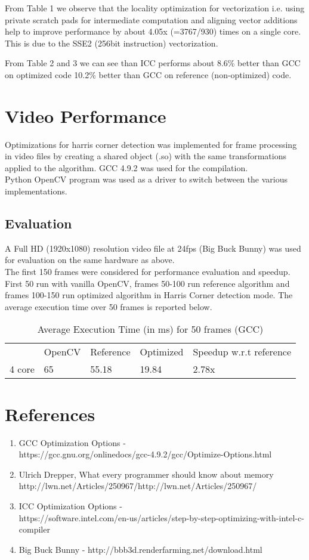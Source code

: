\documentclass[]{article}
\begin{document}
From Table 1 we observe that the locality optimization for vectorization i.e. using private scratch pads for intermediate computation and aligning vector additions help to improve performance by about 4.05x (=3767/930) times on a single core. This is due to the SSE2 (256bit instruction) vectorization.

From Table 2 and 3 we can see than ICC performs about 8.6\% better than GCC on optimized code 10.2\% better than GCC on reference (non-optimized) code.

\section{Video Performance}
Optimizations for harris corner detection was implemented for frame  processing in video files by creating a shared object (.so) with the same transformations applied to the algorithm. GCC 4.9.2 was used for the compilation.\\
Python OpenCV program was used as  a driver to switch between the various implementations.
\subsection{Evaluation}
A Full HD (1920x1080) resolution video file at 24fps (Big Buck Bunny) was used for evaluation on the same hardware as above.\\
The first 150 frames were considered for performance evaluation and speedup. First 50 run with vanilla OpenCV, frames 50-100 run reference algorithm and frames 100-150 run optimized algorithm in Harris Corner detection mode. The average execution time over 50 frames is reported below.
\begin{table}[h!]
\caption{Average Execution Time (in ms) for 50 frames (GCC)}
\begin{center}
\begin{tabular}{l|l|l|l|l}
& OpenCV & Reference & Optimized & Speedup w.r.t reference\\
4 core & 65 & 55.18 & 19.84 & 2.78x \\
\end{tabular}
\end{center}
\end{table}

\section{References}
\begin{enumerate}
\item GCC Optimization Options -\\ https://gcc.gnu.org/onlinedocs/gcc-4.9.2/gcc/Optimize-Options.html
\item Ulrich Drepper, What every programmer should know about memory http://lwn.net/Articles/250967/http://lwn.net/Articles/250967/
\item ICC Optimization Options - \\
https://software.intel.com/en-us/articles/step-by-step-optimizing-with-intel-c-compiler
\item Big Buck Bunny - http://bbb3d.renderfarming.net/download.html
\end{enumerate}
\end{document}
